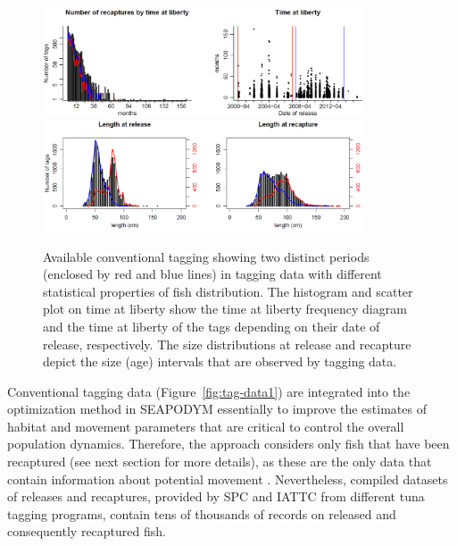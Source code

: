 \begin{figure}[H]
  \centering
  \includegraphics[width=0.85\textwidth]{chapter4/figs/tag-time-at-liberty}\\          
  \includegraphics[width=0.85\textwidth]{chapter4/figs/tag-relrec-sizes}
  \caption{Available conventional tagging showing two distinct periods (enclosed by red and blue lines) in tagging data with different statistical properties of fish distribution. The histogram and scatter plot on time at liberty show the time at liberty frequency diagram and the time at liberty of the tags depending on their date of release, respectively. The size distributions at release and recapture depict the size (age) intervals that are observed by tagging data.}
  \label{fig:tag-data2}
\end{figure}

Conventional tagging data (Figure~\ref{fig:tag-data1}) are integrated into the optimization method in SEAPODYM essentially to improve the estimates of habitat and movement parameters that are critical to control the overall population dynamics. Therefore, the approach considers only fish that have been recaptured (see next section for more details), as these are the only data that contain information about potential movement \citep{Senina20b}. Nevertheless, compiled datasets of releases and recaptures, provided by SPC and IATTC from different tuna tagging programs, contain tens of thousands of records on released and consequently recaptured fish. 

